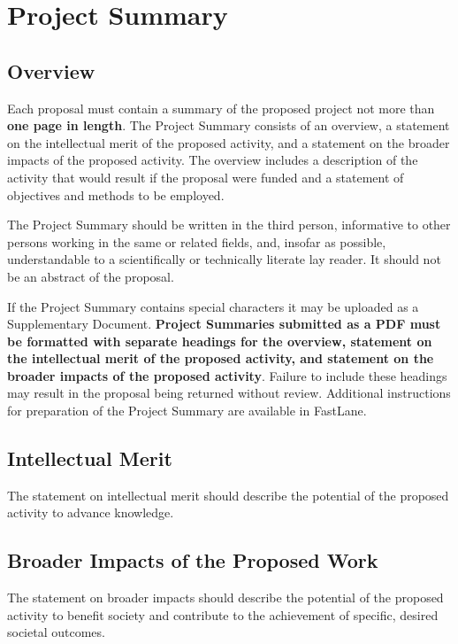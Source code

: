 \section{Project Summary}
\subsection{Overview} 
Each proposal must contain a summary of the proposed project not more than {\bf one page in length}. The Project
Summary consists of an overview, a statement on the intellectual merit of the proposed activity, and a statement
on the broader impacts of the proposed activity.
The overview includes a description of the activity that would result if the proposal were funded and a statement
of objectives and methods to be employed.  

The Project Summary should be written in the third person, informative to other persons working in
the same or related fields, and, insofar as possible, understandable to a scientifically or technically 
literate lay reader. It should not be an abstract of the proposal.

If the Project Summary contains special characters it may be uploaded as a Supplementary Document.
{\bf Project Summaries submitted as a PDF must be formatted with separate headings for the overview, statement on the
intellectual merit of the proposed activity, and statement on the broader impacts of the proposed activity}. Failure
to include these headings may result in the proposal being returned without review.
Additional instructions for preparation of the Project Summary are available in FastLane.\\
\subsection{Intellectual Merit} 
The statement on intellectual merit should describe the potential of the proposed activity to advance knowledge.
\subsection{Broader Impacts of the Proposed Work} 
The statement on broader impacts should describe the potential of the proposed activity to benefit society and contribute to the achievement of specific, desired societal outcomes.
